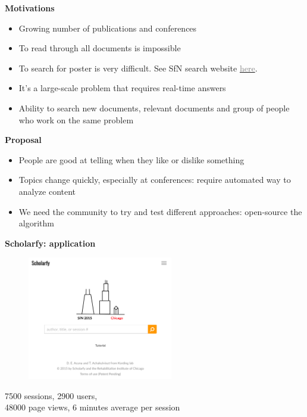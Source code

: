 \begin{frame}{\textbf{Motivations}}

\begin{itemize}
\item Growing number of publications and conferences
\item To read through all documents is impossible
\item To search for poster is very difficult. See SfN search website \href{http://www.abstractsonline.com/plan/BrowseResults.aspx?date=11/15/2014&mkey=\%7B54C85D94-6D69-4B09-AFAA-502C0E680CA7\%7D}{\textcolor{gray}{here}}.
\item It's a large-scale problem that requires real-time answers
\item Ability to search new documents, relevant documents and group of people who work on the same problem
\end{itemize}

\end{frame}


\begin{frame}{\textbf{Proposal}}

\begin{itemize}
\item People are good at telling when they like or dislike something
\item Topics change quickly, especially at conferences: require automated way to analyze content
\item We need the community to try and test different approaches: open-source the algorithm
\end{itemize}

\end{frame}


\begin{frame}{\textbf{Scholarfy: application}}

\begin{figure}
\href{http://www.scholarfy.net}{\includegraphics[width=2.5in]{images/scholarfy}}\\
\end{figure}

7500 sessions, 2900 users, \\
48000 page views, 6 minutes average per session

\end{frame}


